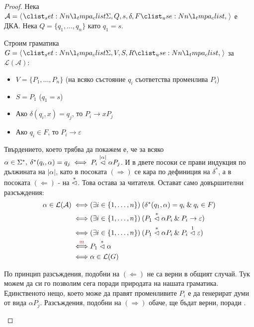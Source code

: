 \begin{proof}
    Нека $\mathcal{A} = \opair{\Sigma, Q, s, \delta, F}$ е ДКА.
    Нека $Q = \{ q_1, \dots, q_n \}$ като $q_1 = s$.

    Строим граматика $G = \opair{\Sigma, V, S, R}$ за $\mathcal{L(A)}$:
    \begin{itemize}
        \item $V = \{ P_1, \dots, P_n \}$ (на всяко състояние $q_i$ съответства променлива $P_i$)
        \item $S = P_1$ ($q_1 = s$)
        \item Ако $\delta(q_i, x) = q_j$, то $P_i \rightarrow x P_j$
        \item Ако $q_i \in F$, то $P_i \rightarrow \varepsilon$
    \end{itemize}

    Твърдението, което трябва да покажем е, че за всяко $\alpha \in \Sigma^*, \: \delta^*(q_i, \alpha) = q_j \iff P_i \stackrel{|\alpha|}{\vartriangleleft} \alpha P_j$.
    И в двете посоки се прави индукция по дължината на $|\alpha|$, като в посоката $(\Rightarrow)$ се кара по дефиниция на $\delta^*$, а в посоката $(\Leftarrow)$ - на $\stackrel{*}{\vartriangleleft}$.
    Това остава за читателя.
    Остават само довършителни разсъждения:
    \begin{align*}
        \alpha \in \mathcal{L(A)}  \iff       & (\exists i \in \{ 1, \dots, n \}) \: (\delta^*(q_1, \alpha) = q_i \: \& \: q_i \in F)              \\
        \iff                                  & (\exists i \in \{ 1, \dots, n \}) \: (P_1 \stackrel{*}{\vartriangleleft} \alpha P_i \: \& \: P_i \rightarrow \varepsilon) \\
        \iff                                  & (\exists i \in \{ 1, \dots, n \}) \: (P_1 \stackrel{*}{\vartriangleleft} \alpha P_i \: \& \: P_i \stackrel{1}{\vartriangleleft} \varepsilon)     \\
        \stackrel{\textcolor{red}{!!!}}{\iff} & P_1 \stackrel{*}{\vartriangleleft} \alpha                                                                                 \\
        \iff                                  & \alpha \in \mathcal{L}(G)
    \end{align*}
    \begin{warning}[\textcolor{red}{!!!}]
        По принцип разсъждения, подобни на $(\Leftarrow)$ не са верни в общият случай.
        Тук можем да си го позволим сега поради природата на нашата граматика.
        Единственото нещо, което може да правят променливите $P_i$ е да генерират думи от вида $\alpha P_j$.
        Разсъждения, подобни на $(\Rightarrow)$ обаче, ще бъдат верни, поради .
    \end{warning}
\end{proof}

